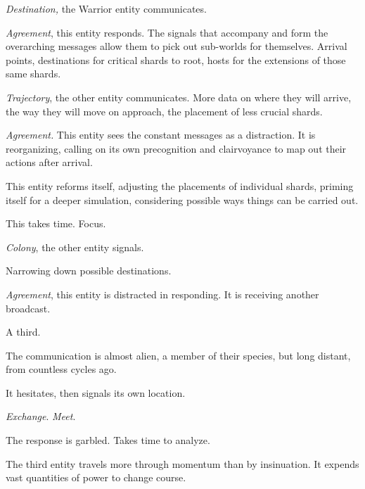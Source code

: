 \emph{Destination, }the Warrior entity communicates.



\emph{Agreement}, this entity responds.  The signals that accompany and form the overarching messages allow them to pick out sub-worlds for themselves.  Arrival points, destinations for critical shards to root, hosts for the extensions of those same shards.



\emph{Trajectory}, the other entity communicates.  More data on where they will arrive, the way they will move on approach, the placement of less crucial shards.



\emph{Agreement.  }This entity sees the constant messages as a distraction.  It is reorganizing, calling on its own precognition and clairvoyance to map out their actions after arrival.



This entity reforms itself, adjusting the placements of individual shards, priming itself for a deeper simulation, considering possible ways things can be carried out.



This takes time.  Focus.



\emph{Colony}, the other entity signals.



Narrowing down possible destinations.



\emph{Agreement}, this entity is distracted in responding.  It is receiving another broadcast.



A third.



The communication is almost alien, a member of their species, but long distant, from countless cycles ago.



It hesitates, then signals its own location.



\emph{Exchange}.  \emph{Meet}.



The response is garbled.  Takes time to analyze.



The third entity travels more through momentum than by insinuation.  It expends vast quantities of power to change course.



